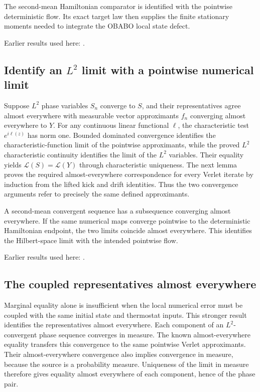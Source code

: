 \documentclass[11pt,a4paper]{report}
\begin{document}
The second-mean Hamiltonian comparator is identified with the pointwise deterministic flow. Its exact target law then supplies the finite stationary moments needed to integrate the OBABO local state defect.



Earlier results used here: \cite[Section~3.28]{LangevinLean2026ULASC}.
\subsection{\texorpdfstring{Identify an \(L^{2}\) limit with a pointwise numerical limit}{Identify an L² limit with a pointwise numerical limit}}
\label{report-step-KineticLangevin-LpHamiltonianLaw-lean-1}


Suppose \(L^{2}\) phase variables \(S_n\) converge to \(S\), and their representatives agree almost everywhere with measurable vector approximants \(f_n\) converging almost everywhere to \(Y\). For any continuous linear functional \(\ell\), the characteristic test \(e^{i\ell(z)}\) has norm one. Bounded dominated convergence identifies the characteristic-function limit of the pointwise approximants, while the proved \(L^{2}\) characteristic continuity identifies the limit of the \(L^{2}\) variables. Their equality yields \(\mathcal L(S)=\mathcal L(Y)\) through characteristic uniqueness. The next lemma proves the required almost-everywhere correspondence for every Verlet iterate by induction from the lifted kick and drift identities. Thus the two convergence arguments refer to precisely the same defined approximants.



A second-mean convergent sequence has a subsequence converging almost everywhere. If the same numerical maps converge pointwise to the deterministic Hamiltonian endpoint, the two limits coincide almost everywhere. This identifies the Hilbert-space limit with the intended pointwise flow.



Earlier results used here: \cite[Section~3.13.2]{LangevinLean2026ULASC}.
\subsection{\texorpdfstring{The coupled representatives almost everywhere}{The coupled representatives almost everywhere}}
\label{report-step-KineticLangevin-LpHamiltonianLaw-lean-2}


Marginal equality alone is insufficient when the local numerical error must be coupled with the same initial state and thermostat inputs. This stronger result identifies the representatives almost everywhere. Each component of an \(L^{2}\)-convergent phase sequence converges in measure. The known almost-everywhere equality transfers this convergence to the same pointwise Verlet approximants. Their almost-everywhere convergence also implies convergence in measure, because the source is a probability measure. Uniqueness of the limit in measure therefore gives equality almost everywhere of each component, hence of the phase pair.
\end{document}
